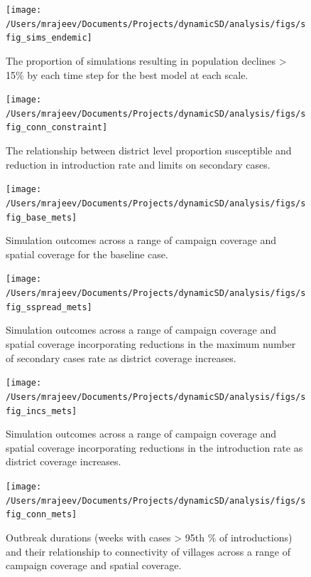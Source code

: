 \documentclass[
]{book}
\begin{document}
\begin{figure}
\texttt{[image: /Users/mrajeev/Documents/Projects/dynamicSD/analysis/figs/sfig\_sims\_endemic]} \caption{The proportion of simulations resulting in population declines \textgreater{} 15\% by each time step for the best model at each scale.}\label{fig:sfig-sims-endemic}
\end{figure}



\begin{figure}
\texttt{[image: /Users/mrajeev/Documents/Projects/dynamicSD/analysis/figs/sfig\_conn\_constraint]} \caption{The relationship between district level proportion susceptible and reduction in introduction rate and limits on secondary cases.}\label{fig:sfig-conn-constraint}
\end{figure}



\begin{figure}
\texttt{[image: /Users/mrajeev/Documents/Projects/dynamicSD/analysis/figs/sfig\_base\_mets]} \caption{Simulation outcomes across a range of campaign coverage and spatial coverage for the baseline case.}\label{fig:sfig-base-mets}
\end{figure}



\begin{figure}
\texttt{[image: /Users/mrajeev/Documents/Projects/dynamicSD/analysis/figs/sfig\_sspread\_mets]} \caption{Simulation outcomes across a range of campaign coverage and spatial coverage incorporating reductions in the maximum number of secondary cases rate as district coverage increases.}\label{fig:sfig-sspread-mets}
\end{figure}



\begin{figure}
\texttt{[image: /Users/mrajeev/Documents/Projects/dynamicSD/analysis/figs/sfig\_incs\_mets]} \caption{Simulation outcomes across a range of campaign coverage and spatial coverage incorporating reductions in the introduction rate as district coverage increases.}\label{fig:sfig-incs-mets}
\end{figure}



\begin{figure}
\texttt{[image: /Users/mrajeev/Documents/Projects/dynamicSD/analysis/figs/sfig\_conn\_mets]} \caption{Outbreak durations (weeks with cases \textgreater{} 95th \% of introductions) and their relationship to connectivity of villages across a range of campaign coverage and spatial coverage.}\label{fig:sfig-conn-mets}
\end{figure}
\end{document}
